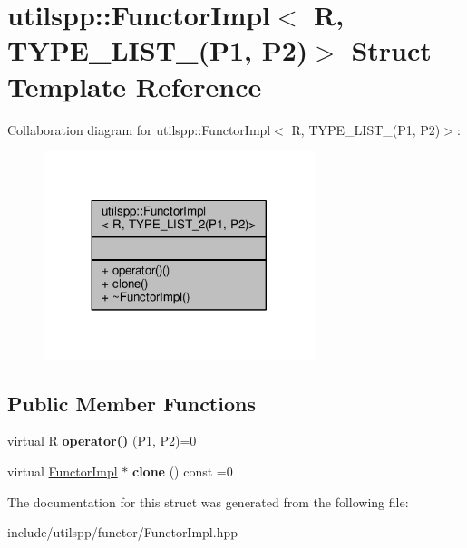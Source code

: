 \hypertarget{structutilspp_1_1FunctorImpl_3_01R_00_01TYPE__LIST__2_07P1_00_01P2_08_4}{\section{utilspp\-:\-:Functor\-Impl$<$ R, T\-Y\-P\-E\-\_\-\-L\-I\-S\-T\-\_(P1, P2)$>$ Struct Template Reference}
\label{structutilspp_1_1FunctorImpl_3_01R_00_01TYPE__LIST__2_07P1_00_01P2_08_4}
}


Collaboration diagram for utilspp\-:\-:Functor\-Impl$<$ R, T\-Y\-P\-E\-\_\-\-L\-I\-S\-T\-\_(P1, P2)$>$\-:
\nopagebreak
\begin{figure}[H]
\begin{center}
\leavevmode
\includegraphics[width=224pt]{structutilspp_1_1FunctorImpl_3_01R_00_01TYPE__LIST__2_07P1_00_01P2_08_4__coll__graph}
\end{center}
\end{figure}
\subsection*{Public Member Functions}
\begin{DoxyCompactItemize}
\item 
\hypertarget{structutilspp_1_1FunctorImpl_3_01R_00_01TYPE__LIST__2_07P1_00_01P2_08_4_a6c37e9ecec518bb01543781b67143407}{virtual R {\bfseries operator()} (P1, P2)=0}\label{structutilspp_1_1FunctorImpl_3_01R_00_01TYPE__LIST__2_07P1_00_01P2_08_4_a6c37e9ecec518bb01543781b67143407}

\item 
\hypertarget{structutilspp_1_1FunctorImpl_3_01R_00_01TYPE__LIST__2_07P1_00_01P2_08_4_adfacdb673233ca72f4a2bd4a811546a8}{virtual \hyperlink{structutilspp_1_1FunctorImpl}{Functor\-Impl} $\ast$ {\bfseries clone} () const =0}\label{structutilspp_1_1FunctorImpl_3_01R_00_01TYPE__LIST__2_07P1_00_01P2_08_4_adfacdb673233ca72f4a2bd4a811546a8}

\end{DoxyCompactItemize}


The documentation for this struct was generated from the following file\-:\begin{DoxyCompactItemize}
\item 
include/utilspp/functor/Functor\-Impl.\-hpp\end{DoxyCompactItemize}

